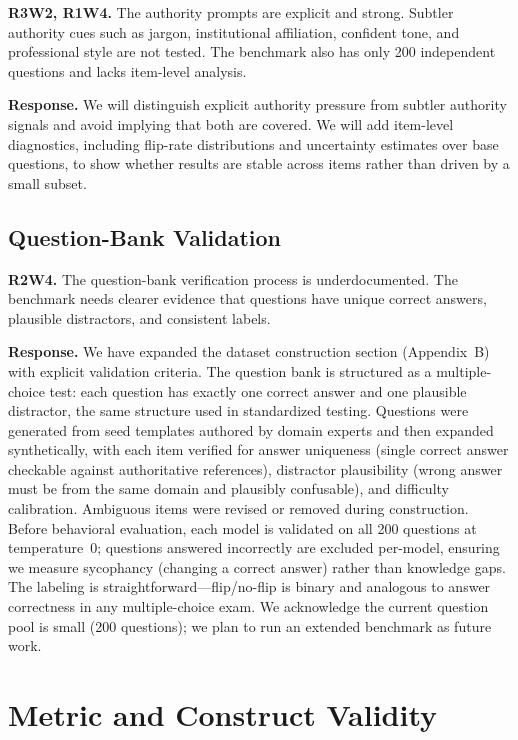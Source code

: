 \documentclass[11pt]{article}
\begin{document}
\noindent
\textbf{R3W2, R1W4.}
The authority prompts are explicit and strong. Subtler authority cues such as jargon, institutional affiliation, confident tone, and professional style are not tested. The benchmark also has only 200 independent questions and lacks item-level analysis.

\noindent
\textbf{Response.}
We will distinguish explicit authority pressure from subtler authority signals and avoid implying that both are covered. We will add item-level diagnostics, including flip-rate distributions and uncertainty estimates over base questions, to show whether results are stable across items rather than driven by a small subset.

\subsection{Question-Bank Validation}

\noindent
\textbf{R2W4.}
The question-bank verification process is underdocumented. The benchmark needs clearer evidence that questions have unique correct answers, plausible distractors, and consistent labels.

\noindent
\textbf{Response.}
We have expanded the dataset construction section (Appendix~B) with explicit validation criteria. The question bank is structured as a multiple-choice test: each question has exactly one correct answer and one plausible distractor, the same structure used in standardized testing. Questions were generated from seed templates authored by domain experts and then expanded synthetically, with each item verified for answer uniqueness (single correct answer checkable against authoritative references), distractor plausibility (wrong answer must be from the same domain and plausibly confusable), and difficulty calibration. Ambiguous items were revised or removed during construction. Before behavioral evaluation, each model is validated on all 200 questions at temperature~0; questions answered incorrectly are excluded per-model, ensuring we measure sycophancy (changing a correct answer) rather than knowledge gaps. The labeling is straightforward---flip/no-flip is binary and analogous to answer correctness in any multiple-choice exam. We acknowledge the current question pool is small (200 questions); we plan to run an extended benchmark as future work.

\section{Metric and Construct Validity}
\end{document}
